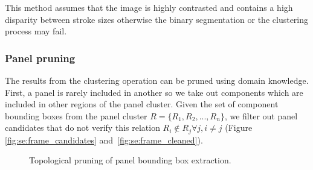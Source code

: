 This method assumes that the image is highly contrasted and contains a high disparity between stroke sizes otherwise the binary segmentation or the clustering process may fail.

\subsubsection{Panel pruning} %
\label{par:se:pruning}
The results from the clustering operation can be pruned using domain knowledge.
First, a panel is rarely included in another so we take out components which are included in other regions of the panel cluster.  
Given the set of component bounding boxes from the panel cluster $R = \{R_1, R_2, ... , R_n\}$, we filter out panel candidates that do not verify this relation $R_i\notin{R_j} \forall j, i \neq j$ (Figure \ref{fig:se:frame_candidates} and~\ref{fig:se:frame_cleaned}).

	\begin{figure}	%
	  \centering
			\hspace{2em}
		  \caption[Topological pruning of panel bounding box extraction]{Topological pruning of panel bounding box extraction.}
	\end{figure}

